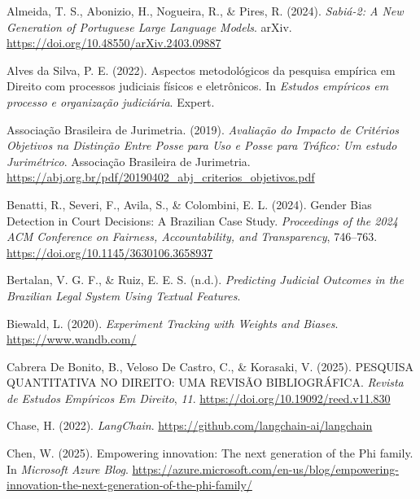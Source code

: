 \documentclass[
  12pt,
]{article}
\newlength{\cslhangindent}
\newenvironment{CSLReferences}[2] %
 {\begin{list}{}{%
  \setlength{\itemindent}{0pt}
  \setlength{\leftmargin}{0pt}
  \setlength{\parsep}{0pt}
  \ifodd #1
   \setlength{\leftmargin}{\cslhangindent}
   \setlength{\itemindent}{-1\cslhangindent}
  \fi
  \setlength{\itemsep}{#2\baselineskip}}}
 {\end{list}}
\begin{document}
\label{refs}
\begin{CSLReferences}{1}{0}
Almeida, T. S., Abonizio, H., Nogueira, R., \& Pires, R. (2024).
\emph{Sabiá-2: {A} {New} {Generation} of {Portuguese} {Large} {Language}
{Models}}. arXiv. \url{https://doi.org/10.48550/arXiv.2403.09887}

Alves da Silva, P. E. (2022). Aspectos metodológicos da pesquisa
empírica em {Direito} com processos judiciais físicos e eletrônicos. In
\emph{Estudos empíricos em processo e organização judiciária}. Expert.

Associação Brasileira de Jurimetria. (2019). \emph{Avaliação do
{Impacto} de {Critérios} {Objetivos} na {Distinção} {Entre} {Posse} para
{Uso} e {Posse} para {Tráfico}: {Um} estudo {Jurimétrico}}. Associação
Brasileira de Jurimetria.
\url{https://abj.org.br/pdf/20190402_abj_criterios_objetivos.pdf}

Benatti, R., Severi, F., Avila, S., \& Colombini, E. L. (2024). Gender
{Bias} {Detection} in {Court} {Decisions}: {A} {Brazilian} {Case}
{Study}. \emph{Proceedings of the 2024 {ACM} {Conference} on {Fairness},
{Accountability}, and {Transparency}}, 746--763.
\url{https://doi.org/10.1145/3630106.3658937}

Bertalan, V. G. F., \& Ruiz, E. E. S. (n.d.). \emph{Predicting
{Judicial} {Outcomes} in the {Brazilian} {Legal} {System} {Using}
{Textual} {Features}}.

Biewald, L. (2020). \emph{Experiment {Tracking} with {Weights} and
{Biases}}. \url{https://www.wandb.com/}

Cabrera De Bonito, B., Veloso De Castro, C., \& Korasaki, V. (2025).
{PESQUISA} {QUANTITATIVA} {NO} {DIREITO}: {UMA} {REVISÃO}
{BIBLIOGRÁFICA}. \emph{Revista de Estudos Empíricos Em Direito},
\emph{11}. \url{https://doi.org/10.19092/reed.v11.830}

Chase, H. (2022). \emph{{LangChain}}.
\url{https://github.com/langchain-ai/langchain}

Chen, W. (2025). Empowering innovation: {The} next generation of the
{Phi} family. In \emph{Microsoft Azure Blog}.
\url{https://azure.microsoft.com/en-us/blog/empowering-innovation-the-next-generation-of-the-phi-family/}


\end{CSLReferences}
\end{document}

